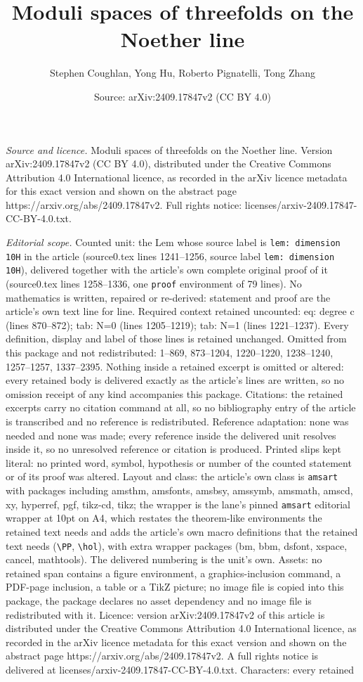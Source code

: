 \documentclass[10pt,a4paper]{amsart}
\title[Moduli spaces of threefolds on the Noether line]{Moduli spaces of threefolds on the Noether line}
\author{Stephen Coughlan, Yong Hu, Roberto Pignatelli, Tong Zhang}
\date{Source: arXiv:2409.17847v2 (CC BY 4.0)}
\begin{document}
\maketitle

\noindent\emph{Source and licence.} Moduli spaces of threefolds on the Noether line. Version arXiv:2409.17847v2 (CC BY 4.0), distributed under the Creative Commons Attribution 4.0 International licence, as recorded in the arXiv licence metadata for this exact version and shown on the abstract page https://arxiv.org/abs/2409.17847v2. Full rights notice: licenses/arxiv-2409.17847-CC-BY-4.0.txt.\par\smallskip

\noindent\textit{Editorial scope.} Counted unit: the Lem whose source label is \texttt{lem: dimension 10H} in the article (source0.tex lines 1241--1256, source label \texttt{lem: dimension 10H}), delivered together with the article's own complete original proof of it (source0.tex lines 1258--1336, one \texttt{proof} environment of 79 lines). No mathematics is written, repaired or re-derived: statement and proof are the article's own text line for line. Required context retained uncounted: eq: degree c (lines 870--872); tab: N=0 (lines 1205--1219); tab: N=1 (lines 1221--1237). Every definition, display and label of those lines is retained unchanged. Omitted from this package and not redistributed: 1--869, 873--1204, 1220--1220, 1238--1240, 1257--1257, 1337--2395. Nothing inside a retained excerpt is omitted or altered: every retained body is delivered exactly as the article's lines are written, so no omission receipt of any kind accompanies this package. Citations: the retained excerpts carry no citation command at all, so no bibliography entry of the article is transcribed and no reference is redistributed. Reference adaptation: none was needed and none was made; every reference inside the delivered unit resolves inside it, so no unresolved reference or citation is produced. Printed slips kept literal: no printed word, symbol, hypothesis or number of the counted statement or of its proof was altered. Layout and class: the article's own class is \texttt{amsart} with packages including amsthm, amsfonts, amsbsy, amssymb, amsmath, amscd, xy, hyperref, pgf, tikz-cd, tikz; the wrapper is the lane's pinned \texttt{amsart} editorial wrapper at 10pt on A4, which restates the theorem-like environments the retained text needs and adds the article's own macro definitions that the retained text needs (\texttt{\textbackslash PP}, \texttt{\textbackslash hol}), with extra wrapper packages (bm, bbm, dsfont, xspace, cancel, mathtools). The delivered numbering is the unit's own. Assets: no retained span contains a figure environment, a graphics-inclusion command, a PDF-page inclusion, a table or a TikZ picture; no image file is copied into this package, the package declares no asset dependency and no image file is redistributed with it. Licence: version arXiv:2409.17847v2 of this article is distributed under the Creative Commons Attribution 4.0 International licence, as recorded in the arXiv licence metadata for this exact version and shown on the abstract page https://arxiv.org/abs/2409.17847v2. A full rights notice is delivered at licenses/arxiv-2409.17847-CC-BY-4.0.txt. Characters: every retained 
\end{document}
